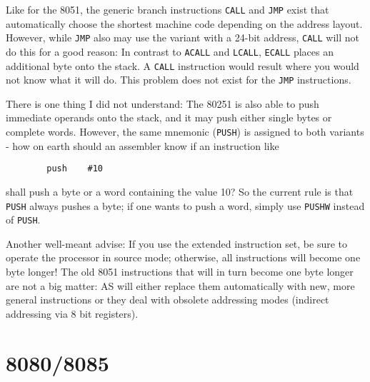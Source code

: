 \documentclass[12pt,twoside]{report}
\newcommand{\tty}[1]{{\tt #1}}
\newcommand{\asname}{{AS}}
\begin{document}
Like for the 8051, the generic branch instructions \tty{CALL} and
\tty{JMP} exist that automatically choose the shortest machine code
depending on the address layout.  However, while \tty{JMP} also may use
the variant with a 24-bit address, \tty{CALL} will not do this for a good
reason: In contrast to \tty{ACALL} and \tty{LCALL}, \tty{ECALL} places an
additional byte onto the stack.  A \tty{CALL} instruction would result where
you would not know what it will do.  This problem does not exist for the
\tty{JMP} instructions.

There is one thing I did not understand: The 80251 is also able to
push immediate operands onto the stack, and it may push either single
bytes or complete words.  However, the same mnemonic (\tty{PUSH}) is
assigned to both variants - how on earth should an assembler know if
an instruction like
\begin{verbatim}
        push    #10
\end{verbatim}
shall push a byte or a word containing the value 10?  So the current
rule is that \tty{PUSH} always pushes a byte; if one wants to push a word,
simply use \tty{PUSHW} instead of \tty{PUSH}.

Another well-meant advise: If you use the extended instruction set,
be sure to operate the processor in source mode; otherwise, all
instructions will become one byte longer!  The old 8051 instructions
that will in turn become one byte longer are not a big matter:  \asname{}
will either replace them automatically with new, more general
instructions or they deal with obsolete addressing modes (indirect
addressing via 8 bit registers).


\section{8080/8085}
\label{8080Spec}
\end{document}
